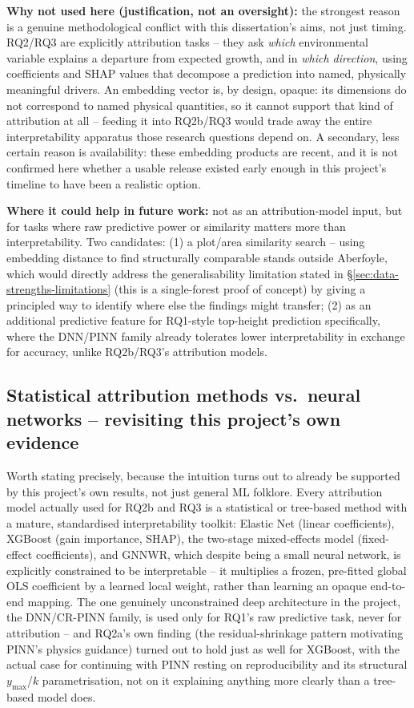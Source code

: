 \textbf{Why not used here (justification, not an oversight):} the strongest reason is a genuine
methodological conflict with this dissertation's aims, not just timing. RQ2/RQ3 are explicitly
attribution tasks -- they ask \emph{which} environmental variable explains a departure from
expected growth, and in \emph{which direction}, using coefficients and SHAP values that decompose
a prediction into named, physically meaningful drivers. An embedding vector is, by design, opaque:
its dimensions do not correspond to named physical quantities, so it cannot support that kind of
attribution at all -- feeding it into RQ2b/RQ3 would trade away the entire interpretability
apparatus those research questions depend on. A secondary, less certain reason is availability:
these embedding products are recent, and it is not confirmed here whether a usable release existed
early enough in this project's timeline to have been a realistic option.

\textbf{Where it could help in future work:} not as an attribution-model input, but for tasks where
raw predictive power or similarity matters more than interpretability. Two candidates: (1) a
plot/area similarity search -- using embedding distance to find structurally comparable stands
outside Aberfoyle, which would directly address the generalisability limitation stated in
\S\ref{sec:data-strengths-limitations} (this is a single-forest proof of concept) by giving a
principled way to identify where else the findings might transfer; (2) as an additional predictive
feature for RQ1-style top-height prediction specifically, where the DNN/PINN family already
tolerates lower interpretability in exchange for accuracy, unlike RQ2b/RQ3's attribution models.

\subsection{Statistical attribution methods vs.\ neural networks -- revisiting this project's own evidence}
\label{sec:futurework-stats-vs-nn}

Worth stating precisely, because the intuition turns out to already be supported by this project's
own results, not just general ML folklore. Every attribution model actually used for RQ2b and RQ3
is a statistical or tree-based method with a mature, standardised interpretability toolkit: Elastic
Net (linear coefficients), XGBoost (gain importance, SHAP), the two-stage mixed-effects model
(fixed-effect coefficients), and GNNWR, which despite being a small neural network, is explicitly
constrained to be interpretable -- it multiplies a frozen, pre-fitted global OLS coefficient by a
learned local weight, rather than learning an opaque end-to-end mapping. The one genuinely
unconstrained deep architecture in the project, the DNN/CR-PINN family, is used only for RQ1's raw
predictive task, never for attribution -- and RQ2a's own finding (the residual-shrinkage pattern
motivating PINN's physics guidance) turned out to hold just as well for XGBoost, with the actual
case for continuing with PINN resting on reproducibility and its structural
$y_{\max}$/$k$ parametrisation, not on it explaining anything more clearly than a tree-based model
does.

